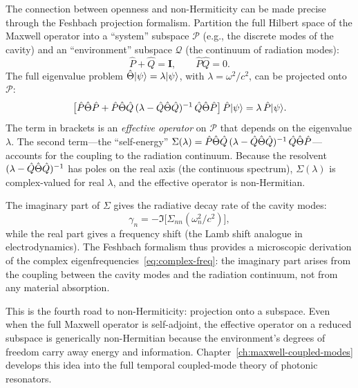 The connection between openness and non-Hermiticity can be made precise
through the Feshbach projection formalism. Partition the full Hilbert
space of the Maxwell operator into a ``system'' subspace $\mathcal{P}$
(e.g., the discrete modes of the cavity) and an ``environment'' subspace
$\mathcal{Q}$ (the continuum of radiation modes):
\begin{equation}
 \hat{P} + \hat{Q} = \mathbf{I}, \qquad
 \hat{P}\hat{Q} = 0.
 \label{eq:feshbach-projection}
\end{equation}
The full eigenvalue problem $\hat{\Theta}|\psi\rangle = \lambda|\psi\rangle$,
with $\lambda = \omega^2/c^2$, can be projected onto $\mathcal{P}$:
\begin{equation}
 \bigl[\hat{P}\hat{\Theta}\hat{P}
 + \hat{P}\hat{\Theta}\hat{Q}\,
 (\lambda - \hat{Q}\hat{\Theta}\hat{Q})^{-1}\,
 \hat{Q}\hat{\Theta}\hat{P}\bigr]\,
 \hat{P}|\psi\rangle
 = \lambda\,\hat{P}|\psi\rangle.
 \label{eq:feshbach}
\end{equation}
The term in brackets is an \emph{effective operator} on $\mathcal{P}$
that depends on the eigenvalue $\lambda$. The second term---the
``self-energy'' $\Sigma(\lambda) = \hat{P}\hat{\Theta}\hat{Q}\,(\lambda -
\hat{Q}\hat{\Theta}\hat{Q})^{-1}\,\hat{Q}\hat{\Theta}\hat{P}$---accounts for the
coupling to the radiation continuum. Because the resolvent
$(\lambda - \hat{Q}\hat{\Theta}\hat{Q})^{-1}$ has poles on the real axis (the
continuous spectrum), $\Sigma(\lambda)$ is complex-valued for real
$\lambda$, and the effective operator is non-Hermitian.

The imaginary part of $\Sigma$ gives the radiative decay rate of the
cavity modes:
\begin{equation}
 \gamma_n = -\Im\!\bigl[\Sigma_{nn}(\omega_n^2/c^2)\bigr],
 \label{eq:feshbach-decay}
\end{equation}
while the real part gives a frequency shift (the Lamb shift analogue in
electrodynamics). The Feshbach formalism thus provides a microscopic
derivation of the complex eigenfrequencies~\eqref{eq:complex-freq}: the
imaginary part arises from the coupling between the cavity modes and the
radiation continuum, not from any material absorption.

This is the fourth road to non-Hermiticity: projection onto a subspace.
Even when the full Maxwell operator is self-adjoint, the effective
operator on a reduced subspace is generically non-Hermitian because the
environment's degrees of freedom carry away energy and information.
Chapter~\ref{ch:maxwell-coupled-modes} develops this idea into the
full temporal coupled-mode theory of photonic resonators.


